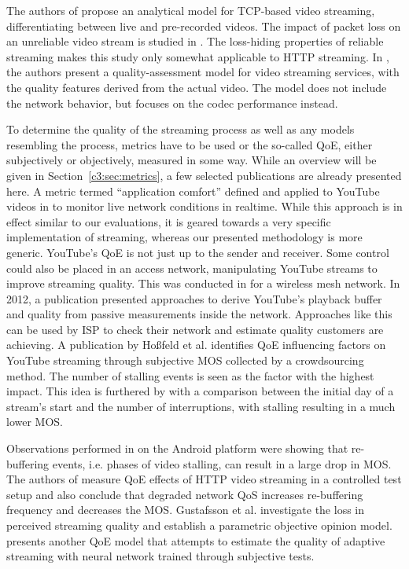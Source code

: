 The authors of \cite{wang2003model} propose an analytical model for TCP-based video streaming, differentiating between live and pre-recorded videos. The impact of packet loss on an unreliable video stream is studied in \cite{pv2010loss}. The loss-hiding properties of reliable streaming makes this study only somewhat applicable to \gls{HTTP} streaming. In \cite{pv2010qoe}, the authors present a quality-assessment model for video streaming services, with the quality features derived from the actual video. The model does not include the network behavior, but focuses on the codec performance instead. 

To determine the quality of the streaming process as well as any models resembling the process, metrics have to be used or the so-called \gls{QoE}, either subjectively or objectively, measured in some way. While an overview will be given in Section~\ref{c3:sec:metrics}, a few selected publications are already presented here. A metric termed ``application comfort'' defined and applied to YouTube videos in \cite{staehle2010yomo} to monitor live network conditions in realtime. While this approach is in effect similar to our evaluations, it is geared towards a very specific implementation of streaming, whereas our presented methodology is more generic. YouTube's \gls{QoE} is not just up to the sender and receiver. Some control could also be placed in an access network, manipulating YouTube streams to improve streaming quality. This was conducted in \cite{5733220} for a wireless mesh network.
In 2012, a publication \cite{6296879} presented approaches to derive YouTube's playback buffer and quality from passive measurements inside the network. Approaches like this can be used by \gls{ISP} to check their network and estimate quality customers are achieving. A publication by Hoßfeld et al. \cite{6123395} identifies \gls{QoE} influencing factors on YouTube streaming through subjective \gls{MOS} collected by a crowdsourcing method. The number of stalling events is seen as the factor with the highest impact. This idea is furthered by \cite{6263849} with a comparison between the initial day of a stream's start and the number of interruptions, with stalling resulting in a much lower \gls{MOS}.

Observations performed in \cite{ketyko2010qoe} on the Android platform were showing that re-buffering events, i.e. phases of video stalling, can result in a large drop in \gls{MOS}. The authors of \cite{mokmeasuring} measure \gls{QoE} effects of \gls{HTTP} video streaming in a controlled test setup and also conclude that degraded network \gls{QoS} increases re-buffering frequency and decreases the \gls{MOS}. Gustafsson et al. \cite{gustafsson2008measuring} investigate the loss in perceived streaming quality and establish a parametric objective opinion model.
\cite{6181070} presents another \gls{QoE} model that attempts to estimate the quality of adaptive streaming with neural network trained through subjective tests.

